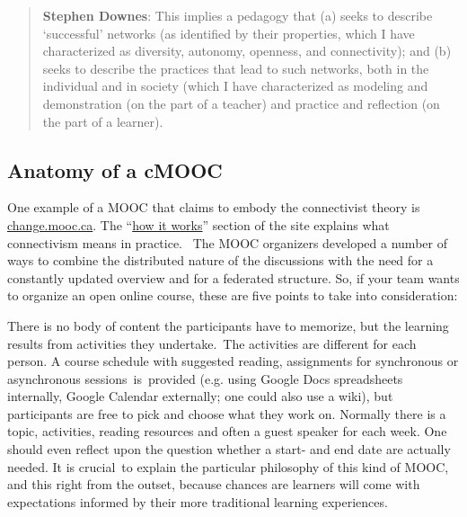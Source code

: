 \begin{quote}
\textbf{Stephen Downes}: This implies a pedagogy that (a) seeks to
describe `successful' networks (as identified by their properties, which
I have characterized as diversity, autonomy, openness, and
connectivity); and (b) seeks to describe the practices that lead to such
networks, both in the individual and in society (which I have
characterized as modeling and demonstration (on the part of a teacher)
and practice and reflection (on the part of a learner).
\end{quote}

\subsection{Anatomy of a cMOOC}

One example of a MOOC that claims to embody the connectivist theory is
\href{http://change.mooc.ca/index.html}{change.mooc.ca}. The
``\href{http://change.mooc.ca/how.htm}{how it works}'' section of the
site explains what connectivism means in practice.~ The MOOC organizers
developed a number of ways to combine the distributed nature of the
discussions with the need for a constantly updated overview and for a
federated structure. So, if your team wants to organize an open online
course, these are five points to take into consideration:

There is no body of content the participants have to memorize, but the
learning results from activities they undertake.~The activities are
different for each person. A course schedule with suggested reading,
assignments for synchronous or asynchronous sessions~is~provided (e.g.
using Google Docs spreadsheets internally, Google Calendar externally;
one could also use a wiki), but participants are free to pick and choose
what they work on. Normally there is a topic, activities, reading
resources and often a guest speaker for each week. One should even
reflect upon the question whether a start- and end date are actually
needed. It is crucial~to explain the particular philosophy of this kind
of MOOC, and this right from the outset, because chances are learners
will come with expectations informed by their more traditional learning
experiences.

